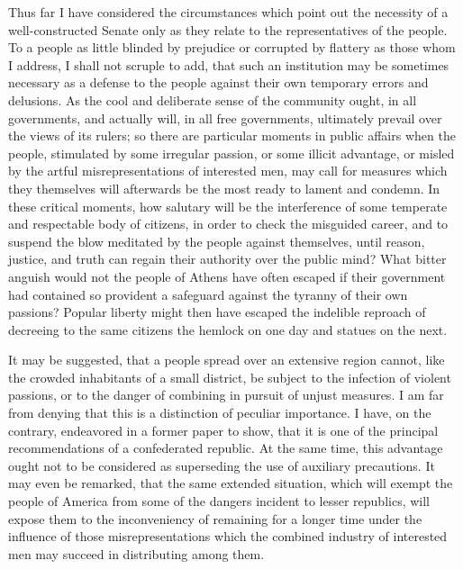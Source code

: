 Thus far I have considered the circumstances which point out the necessity of a well-constructed Senate only as they relate to the representatives of the people. 
To a people as little blinded by prejudice or corrupted by flattery as those whom I address, I shall not scruple to add, that such an institution may be sometimes necessary as a defense to the people against their own temporary errors and delusions. 
As the cool and deliberate sense of the community ought, in all governments, and actually will, in all free governments, ultimately prevail over the views of its rulers; so there are particular moments in public affairs when the people, stimulated by some irregular passion, or some illicit advantage, or misled by the artful misrepresentations of interested men, may call for measures which they themselves will afterwards be the most ready to lament and condemn. 
In these critical moments, how salutary will be the interference of some temperate and respectable body of citizens, in order to check the misguided career, and to suspend the blow meditated by the people against themselves, until reason, justice, and truth can regain their authority over the public mind? 
What bitter anguish would not the people of Athens have often escaped if their government had contained so provident a safeguard against the tyranny of their own passions? 
Popular liberty might then have escaped the indelible reproach of decreeing to the same citizens the hemlock on one day and statues on the next.

It may be suggested, that a people spread over an extensive region cannot, like the crowded inhabitants of a small district, be subject to the infection of violent passions, or to the danger of combining in pursuit of unjust measures. 
I am far from denying that this is a distinction of peculiar importance. 
I have, on the contrary, endeavored in a former paper to show, that it is one of the principal recommendations of a confederated republic. 
At the same time, this advantage ought not to be considered as superseding the use of auxiliary precautions. 
It may even be remarked, that the same extended situation, which will exempt the people of America from some of the dangers incident to lesser republics, will expose them to the inconveniency of remaining for a longer time under the influence of those misrepresentations which the combined industry of interested men may succeed in distributing among them.

